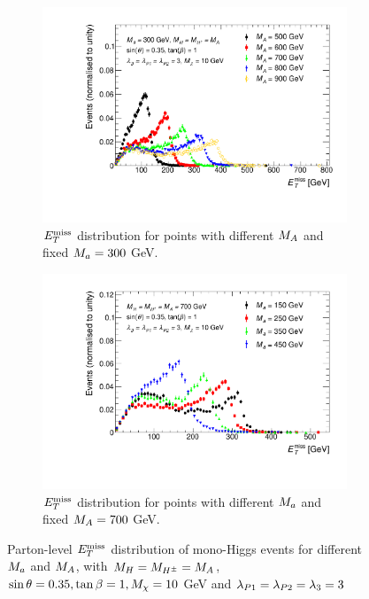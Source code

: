 \begin{figure}%
	\centering

	\begin{subfigure}[t]{0.45\textwidth}
	\centering
	\includegraphics[width=\textwidth]{texinputs/04_grid/figures/monoHbb_m_large_A_scan_MET_liny_norm2one.pdf}
	\caption{$E_T^\mathrm{miss}$ distribution for points with different $M_{A}$
    and fixed $M_{a} = 300$ GeV. 
	\label{fig:monoHbb_mA_scan_met}} 
    \end{subfigure}
    \begin{subfigure}[t]{0.45\textwidth}
	\centering
	\includegraphics[width=\textwidth]{texinputs/04_grid/figures/monoHbb_m_small_a_scan_MET_liny_norm2one.pdf}	
	\caption{$E_T^\mathrm{miss}$ distribution for points with different $M_{a}$ and fixed $ M_{A}= 700$ GeV. \label{fig:monoHbb_ma_scan_met}}
    \end{subfigure}
    
    \caption{Parton-level $E_T^\mathrm{miss}$ distribution of mono-Higgs events for different $M_{a}$ and $M_{A}$, with $M_{H} = M_{H^{\pm}} = M_{A}$, $ \sin\theta = 0.35, \tan\beta = 1, M_{\chi} = 10$ GeV and $ \lambda_{P1} = \lambda_{P2} = \lambda_{3} = 3 $}
\end{figure}

